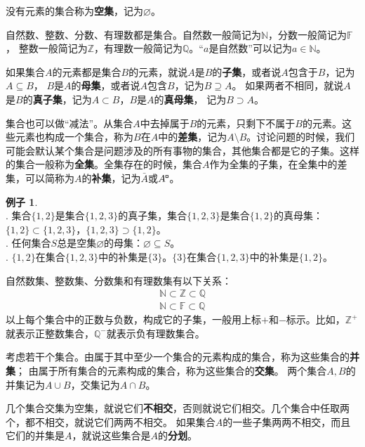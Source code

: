 \documentclass[12pt,UTF8]{ctexbook}
\theoremstyle{definition}
\newtheorem{ex}{例子}[section]
\theoremstyle{plain}
\newcommand{\bu}{\mathbin{\text{\tikz[baseline=-0.6ex]{
    \node[draw, fill=black, minimum size=0.8ex, inner sep=0pt, rectangle] (bu) {};
    \node[draw=none, fill=white, minimum size=0.6ex, inner sep=0pt, circle] at (bu.center) {};
}}}}
\begin{document}
没有元素的集合称为\textbf{空集}，记为$\varnothing$。

自然数、整数、分数、有理数都是集合。自然数一般简记为$\mathbb{N}$，分数一般简记为$\mathbb{F}$，
整数一般简记为$\mathbb{Z}$，有理数一般简记为$\mathbb{Q}$。“$a$是自然数”可以记为$a\in\mathbb{N}$。

如果集合$A$的元素都是集合$B$的元素，就说$A$是$B$的\textbf{子集}，或者说$A$包含于$B$，记为$A\subseteq B$，
$B$是$A$的\textbf{母集}，或者说$A$包含$B$，记为$B\supseteq A$。
如果两者不相同，就说$A$是$B$的\textbf{真子集}，记为$A\subset B$，$B$是$A$的\textbf{真母集}，
记为$B\supset A$。

集合也可以做“减法”。从集合$A$中去掉属于$B$的元素，只剩下不属于$B$的元素。这些元素也构成一个集合，称为$B$在$A$中的\textbf{差集}，记为$A\setminus B$。讨论问题的时候，我们可能会默认某个集合是问题涉及的所有事物的集合，其他集合都是它的子集。这样的集合一般称为\textbf{全集}。全集存在的时候，集合$A$作为全集的子集，在全集中的差集，可以简称为$A$的\textbf{补集}，记为$\bar{A}$或$A^{\bu}$。

\begin{ex}\label{ex:2-0-10}
    \mbox{} \\ 
    . 集合$\{1,2\}$是集合$\{1,2,3\}$的真子集，集合$\{1,2,3\}$是集合$\{1,2\}$的真母集：$\{1,2\}\subset \{1,2,3\}$，$\{1,2,3\}\supset \{1,2\}$。\\
    . 任何集合$S$总是空集$\varnothing$的母集：$\varnothing \subseteq S$。\\
    . $\{1,2\}$在集合$\{1,2,3\}$中的补集是$\{3\}$。$\{3\}$在集合$\{1,2,3\}$中的补集是$\{1,2\}$。
\end{ex}

自然数集、整数集、分数集和有理数集有以下关系：
\begin{align*}
    \mathbb{N}\subset\mathbb{Z}\subset\mathbb{Q}  \\
    \mathbb{N}\subset\mathbb{F}\subset\mathbb{Q} 
\end{align*}
以上每个集合中的正数与负数，构成它的子集，一般用上标$+$和$-$标示。比如，$\mathbb{Z}^+$就表示正整数集合，$\mathbb{Q}^-$就表示负有理数集合。

考虑若干个集合。由属于其中至少一个集合的元素构成的集合，称为这些集合的\textbf{并集}；
由属于所有集合的元素构成的集合，称为这些集合的\textbf{交集}。
两个集合$A, B$的并集记为$A\cup B$，交集记为$A\cap B$。

几个集合交集为空集，就说它们\textbf{不相交}，否则就说它们相交。几个集合中任取两个，都不相交，就说它们两两不相交。
如果集合$A$的一些子集两两不相交，而且它们的并集是$A$，就说这些集合是$A$的\textbf{分划}。
\end{document}
